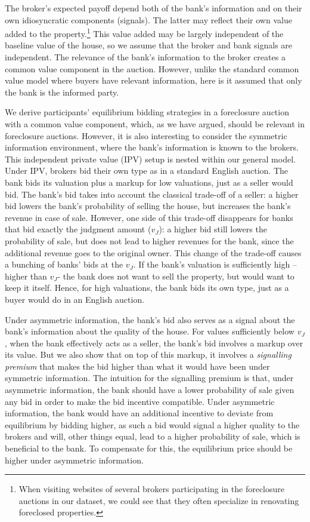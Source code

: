 \documentclass[11pt,twopage]{article}
\begin{document}
The broker's expected payoff depend both of the bank's information and on their own idiosyncratic components (signals). The latter may reflect their own value added to the property.\footnote{When visiting websites of several brokers participating in the foreclosure auctions in our dataset, we could see that they often specialize in renovating foreclosed properties.} This value added may be largely independent of the baseline value of the house, so we assume that the broker and bank signals are independent. The relevance of the bank's information to the broker creates a common value component in the auction. However, unlike the standard common value model where buyers have relevant information, here is it assumed that only the bank is the informed party. 

We derive participants' equilibrium bidding strategies in a foreclosure auction with a common
value component, which, as we have argued, should be relevant in foreclosure auctions. However, it is also interesting to consider the symmetric information environment, where the bank's information is known to the brokers. This independent private value (IPV) setup is nested within our general model. Under IPV, brokers bid their own type as in a standard English auction. The bank bids its valuation plus a markup for low valuations, just as a seller would bid. The bank's bid takes into account the classical trade-off of a seller: a higher bid lowers the bank's probability of selling the house, but increases the bank's revenue in case of sale. However, one side of this trade-off disappears for banks that bid exactly the judgment amount ($v_J$): a higher bid still lowers the probability of sale, but does not lead to higher revenues for the bank, since the additional revenue goes to the original owner. This change of the trade-off causes a bunching of banks' bids at the $v_J$. If the bank's valuation is sufficiently high -- higher than $v_J$- the bank does not want to sell the property, but would want to keep it itself. Hence, for high valuations, the bank bids its own type, just as a buyer would do in an English auction.

Under asymmetric information, the bank's bid also serves as a signal about the bank's information about the quality of the house. For values sufficiently below $v_J$, when the bank effectively acts as a seller, the bank's bid involves a markup over its value. But we also show that on top of this markup, it involves a \emph{signalling premium} that makes the bid higher than what it would have been under symmetric information. The intuition for the signalling premium is that, under asymmetric information, the bank should have a lower probability of sale given any bid in order to make the bid incentive compatible. Under asymmetric information, the bank would have an additional incentive to deviate from equilibrium by bidding higher, as such a bid would signal a higher quality to the brokers and will, other things equal, lead to a higher probability of sale, which is beneficial to the bank. To compensate for this, the equilibrium price should be higher under asymmetric information.
\end{document}
